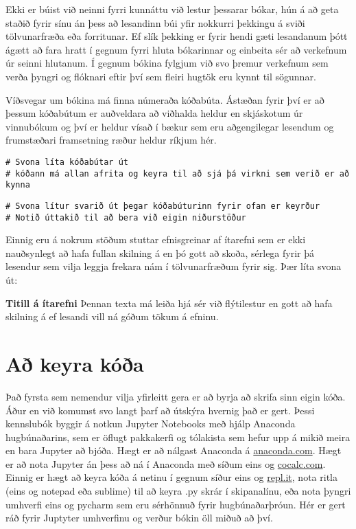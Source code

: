 Ekki er búist við neinni fyrri kunnáttu við lestur þessarar bókar, hún á að geta staðið fyrir sínu án þess að lesandinn búi yfir nokkurri þekkingu á sviði tölvunarfræða eða forritunar.
Ef slík þekking er fyrir hendi gæti lesandanum þótt ágætt að fara hratt í gegnum fyrri hluta bókarinnar og einbeita sér að verkefnum úr seinni hlutanum.
Í gegnum bókina fylgjum við svo þremur verkefnum sem verða þyngri og flóknari eftir því sem fleiri hugtök eru kynnt til sögunnar. 

Víðsvegar um bókina má finna númeraða kóðabúta.
Ástæðan fyrir því er að þessum kóðabútum er auðveldara að viðhalda heldur en skjáskotum úr vinnubókum og því er heldur vísað í bækur sem eru aðgengilegar lesendum og frumstæðari framsetning ræður heldur ríkjum hér.
\lstset{style=uttak}
\lstset{style=venjulegt}
\begin{lstlisting}[caption=Kóðabútar kynntir til sögunnar]
# Svona líta kóðabútar út
# kóðann má allan afrita og keyra til að sjá þá virkni sem verið er að kynna
\end{lstlisting}
\lstset{style=uttak}
\begin{lstlisting}
# Svona lítur svarið út þegar kóðabúturinn fyrir ofan er keyrður
# Notið úttakið til að bera við eigin niðurstöður
\end{lstlisting}
\lstset{style=venjulegt}

Einnig eru á nokrum stöðum stuttar efnisgreinar af ítarefni sem er ekki nauðsynlegt að hafa fullan skilning á en þó gott að skoða, sérlega fyrir þá lesendur sem vilja leggja frekara nám í tölvunarfræðum fyrir sig.
Þær líta svona út:

\begin{itarefni}
\textbf{Titill á ítarefni}
Þennan texta má leiða hjá sér við flýtilestur en gott að hafa skilning á ef lesandi vill ná góðum tökum á efninu.
\end{itarefni}

\section{Að keyra kóða}\label{uk:keyra-koda}

Það fyrsta sem nemendur vilja yfirleitt gera er að byrja að skrifa sinn eigin kóða. 
Áður en við komumst svo langt þarf að útskýra hvernig það er gert. 
Þessi kennslubók byggir á notkun Jupyter Notebooks með hjálp Anaconda hugbúnaðarins, sem er öflugt pakkakerfi og tólakista sem hefur upp á mikið meira en bara Jupyter að bjóða. 
Hægt er að nálgast Anaconda á \href{www.anaconda.com}{anaconda.com}.
Hægt er að nota Jupyter án þess að ná í Anaconda með síðum eins og \href{www.cocalc.com}{cocalc.com}. 
Einnig er hægt að keyra kóða á netinu í gegnum síður eins og \href{www.repl.it}{repl.it}, nota ritla (eins og notepad eða sublime) til að keyra .py skrár í skipanalínu, eða nota þyngri umhverfi eins og pycharm sem eru sérhönnuð fyrir hugbúnaðarþróun. 
Hér er gert ráð fyrir Juptyter umhverfinu og verður bókin öll miðuð að því.



